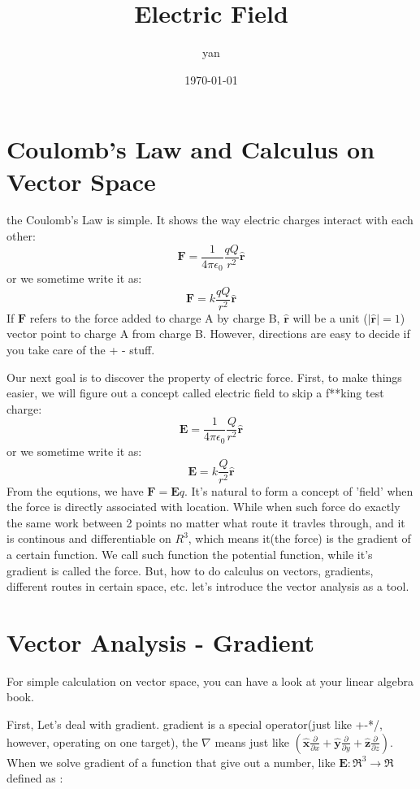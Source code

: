 \documentclass{article}
\title{Electric Field}
\author{yan}
\date{\today}
\begin{document}
\part{Coulomb's Law and Calculus on Vector Space}
the Coulomb's Law is simple. It shows the way electric charges interact with each other:
\begin{equation}
\mathbf{F}=\frac{1}{4\pi\epsilon_0}\frac{qQ}{r^2}\mathbf{\hat{r}}
\end{equation}
or we sometime write it as:
\begin{equation}
\mathbf{F}=k\frac{qQ}{r^2}\mathbf{\hat{r}}
\end{equation}
If $\mathbf{F}$ refers to the force added to charge A by charge B, $\mathbf{\hat{r}}$ will be a unit ($|\mathbf{\hat{r}}| = 1$) vector point to charge A from charge B. However, directions are easy to decide if you take care of the + - stuff.


Our next goal is to discover the property of electric force. First, to make things easier, we will figure out a concept called electric field to skip a f**king test charge:
\begin{equation}
\mathbf{E}=\frac{1}{4\pi\epsilon_0}\frac{Q}{r^2}\mathbf{\hat{r}}
\end{equation}
or we sometime write it as:
\begin{equation}
\mathbf{E}=k\frac{Q}{r^2}\mathbf{\hat{r}}
\end{equation}
From the equtions, we have $\mathbf{F} = \mathbf{E}q$. It's natural to form a concept of 'field' when the force is directly associated with location. While when such force do exactly the same work between 2 points no matter what route it travles through, and it is continous and differentiable on $R^3$, which means it(the force) is the gradient of a certain function. We call such function the potential function, while it's gradient is called the force. But, how to do calculus on vectors, gradients, different routes in certain space, etc. let's introduce the vector analysis as a tool.

\part{Vector Analysis - Gradient}
For simple calculation on vector space, you can have a look at your linear algebra book.


First, Let's deal with gradient. gradient is a special operator(just like +-*/, however, operating on one target), the $\nabla$ means just like $(\mathbf{\hat x} \frac{\partial}{\partial x} + \mathbf{\hat y} \frac{\partial}{\partial y} + \mathbf{\hat z} \frac{\partial}{\partial z})$. When we solve gradient of a function that give out a number, like $\mathbf{E} : \Re^3 \to \Re$ defined as :
\end{document}
